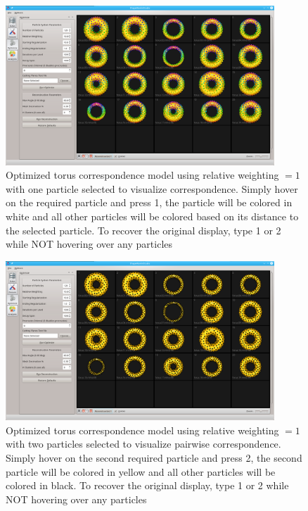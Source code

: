 \documentclass[letterpaper,12pt]{article}   %
\begin{document}
\begin{figure}[!htp]
	\centering
	\includegraphics[width=0.9\textwidth]{figs_v2/torus_optimize_reconstructed_hover1.png}
	\caption{Optimized torus correspondence model using relative weighting $ = 1$ with one particle selected to visualize correspondence. Simply hover on the required particle and press 1, the particle will be colored in white and all other particles will be colored based on its distance to the selected particle. To recover the original display, type 1 or 2 while NOT hovering over any particles}
	\label{fig:torus_optimize_reconstructed_hover1}
\end{figure}

\begin{figure}[!htp]
	\centering
	\includegraphics[width=0.9\textwidth]{figs_v2/torus_optimize_reconstructed_hover2.png}
	\caption{Optimized torus correspondence model using relative weighting $ = 1$ with two particles selected to visualize pairwise correspondence. Simply hover on the second required particle and press 2, the second particle will be colored in yellow and all other particles will be colored in black. To recover the original display, type 1 or 2 while NOT hovering over any particles}
	\label{fig:torus_optimize_reconstructed_hover2}
\end{figure}
\end{document}
